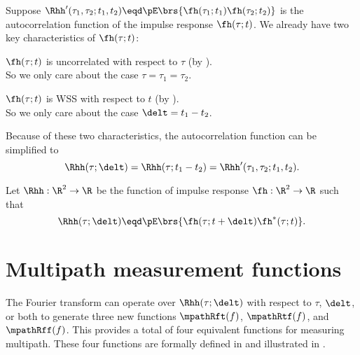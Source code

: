 Suppose 
$\Rhh'(\tau_1,\tau_2;t_1,t_2)\eqd\pE\brs{\fh(\tau_1;t_1)\fh(\tau_2;t_2)}$
is the autocorrelation function of the impulse response $\fh(\tau;t)$.
We already have two key characteristics of $\fh(\tau;t)$:
\begin{enume}
  \item $\fh(\tau;t)$ is uncorrelated with respect to $\tau$
        (by ).\\
        So we only care about the case $\tau=\tau_1=\tau_2$.
  \item $\fh(\tau;t)$ is WSS with respect to $t$
        (by ). \\
        So we only care about the case $\delt=t_1-t_2$.
\end{enume}
Because of these two characteristics, the autocorrelation function
can be simplified to 
\[ \Rhh(\tau;\delt)=\Rhh(\tau;t_1-t_2)=\Rhh'(\tau_1,\tau_2;t_1,t_2).\]

\begin{definition}
\label{def:mp_Rhh}
Let $\Rhh:\R^2\to\R$ be the  function
of impulse response $\fh:\R^2\to\R$ such that
  \[ \Rhh(\tau;\delt)\eqd\pE\brs{\fh(\tau;t+\delt)\fh^\ast(\tau;t)}. \]
\end{definition}

\section{Multipath measurement functions}
The Fourier transform can operate over $\Rhh(\tau;\delt)$
with respect to $\tau$, $\delt$, or both to generate three
new functions $\mpathRft(f)$, $\mpathRtf(f)$, and $\mpathRff(f)$.
This provides a total of four equivalent functions for 
measuring multipath.
These four functions are formally defined in 
 and illustrated in .

